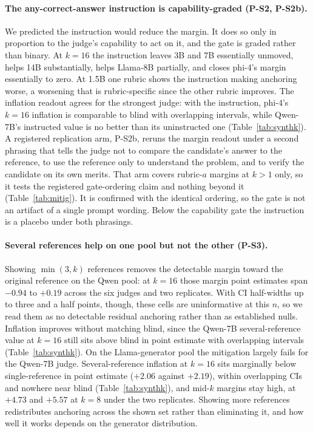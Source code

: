 \documentclass[11pt]{article}
\begin{document}
\paragraph{The any-correct-answer instruction is capability-graded (P-S2, P-S2b).}
We predicted the instruction would reduce the margin.
It does so only in proportion to the judge's capability to act on it, and the gate is graded rather than binary.
At $k{=}16$ the instruction leaves 3B and 7B essentially unmoved, helps 14B substantially, helps Llama-8B partially, and closes phi-4's margin essentially to zero.
At 1.5B one rubric shows the instruction making anchoring worse, a worsening that is rubric-specific since the other rubric improves.
The inflation readout agrees for the strongest judge: with the instruction, phi-4's $k{=}16$ inflation is comparable to blind with overlapping intervals, while Qwen-7B's instructed value is no better than its uninstructed one (Table~\ref{tab:synthk}).
A registered replication arm, P-S2b, reruns the margin readout under a second phrasing that tells the judge not to compare the candidate's answer to the reference, to use the reference only to understand the problem, and to verify the candidate on its own merits.
That arm covers rubric-$a$ margins at $k > 1$ only, so it tests the registered gate-ordering claim and nothing beyond it (Table~\ref{tab:mitig}).
It is confirmed with the identical ordering, so the gate is not an artifact of a single prompt wording.
Below the capability gate the instruction is a placebo under both phrasings.

\paragraph{Several references help on one pool but not the other (P-S3).}
Showing $\min(3, k)$ references removes the detectable margin toward the original reference on the Qwen pool: at $k{=}16$ those margin point estimates span $-0.94$ to $+0.19$ across the six judges and two replicates.
With CI half-widths up to three and a half points, though, these cells are uninformative at this $n$, so we read them as no detectable residual anchoring rather than as established nulls.
Inflation improves without matching blind, since the Qwen-7B several-reference value at $k{=}16$ still sits above blind in point estimate with overlapping intervals (Table~\ref{tab:synthk}).
On the Llama-generator pool the mitigation largely fails for the Qwen-7B judge.
Several-reference inflation at $k{=}16$ sits marginally below single-reference in point estimate ($+2.06$ against $+2.19$), within overlapping CIs and nowhere near blind (Table~\ref{tab:synthk}), and mid-$k$ margins stay high, at $+4.73$ and $+5.57$ at $k{=}8$ under the two replicates.
Showing more references redistributes anchoring across the shown set rather than eliminating it, and how well it works depends on the generator distribution.
\end{document}
